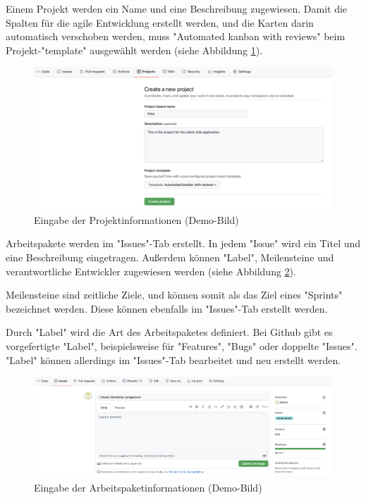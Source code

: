 Einem Projekt werden ein Name und eine Beschreibung zugewiesen. Damit die Spalten für die agile Entwicklung erstellt werden, und die Karten darin automatisch verschoben werden, muss  "Automated kanban with reviews" beim Projekt-"template" ausgewählt werden (siehe Abbildung \ref{fig:enterProjectInfo}).

\begin{figure}[H]
    \centering
    \includegraphics[width=\textwidth]{media/ProjectManagement/EnterProjectInfo.png}
    \caption{Eingabe der Projektinformationen (Demo-Bild)}
    \label{fig:enterProjectInfo}
\end{figure}


Arbeitspakete werden im "Issues"-Tab erstellt. In jedem "Issue" wird ein Titel und eine Beschreibung eingetragen. Außerdem können "Label", Meilensteine und verantwortliche Entwickler zugewiesen werden (siehe Abbildung \ref{fig:createIssue}). 

Meilensteine sind zeitliche Ziele, und können somit als das Ziel eines "Sprints" bezeichnet werden. Diese können ebenfalls im "Issues"-Tab erstellt werden.

Durch "Label" wird die Art des Arbeitspaketes definiert. Bei Github gibt es vorgefertigte "Label", beispielsweise für "Features", "Bugs" oder doppelte "Issues". "Label" können allerdings im "Issues"-Tab bearbeitet und neu erstellt werden.

\begin{figure}[H]
    \centering
    \includegraphics[width=\textwidth]{media/ProjectManagement/CreateIssue.png}
    \caption{Eingabe der Arbeitspaketinformationen (Demo-Bild)}
    \label{fig:createIssue}
\end{figure}

